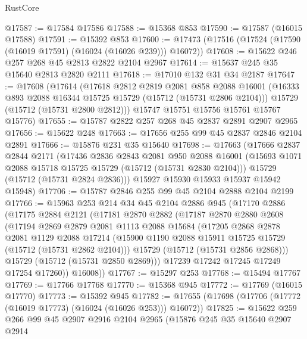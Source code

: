 \begin{lexlean}{RustCore}
\begin{coremodule}
@17587 := @17584 @17586
@17588 := @15368 @853
@17590 := @17587 (@16015 @17588)
@17591 := @15392 @853
@17600 := @17473 (@17516 (@17524 (@17590 (@16019 @17591) (@16024 (@16026 @239))) @16072))
@17608 := @15622 @246 @257 @268 @45 @2813 @2822 @2104 @2967
@17614 := @15637 @245 @35 @15640 @2813 @2820 @2111
@17618 := @17010 @132 @31 @34 @2187
@17647 := @17608
    (@17614
      (@17618
        @2812
        @2819
        @2081
        @858
        @2088
        @16001
        (@16333 @893 @2088 @16344 @15725 @15729 (@15712 (@15731 @2806 @2104)))
        @15729
        (@15712 (@15731 @2800 @2812)))
      @15747
      @15751
      @15756
      @15761
      @15767
      @15776)
@17655 := @15787 @2822 @257 @268 @45 @2837 @2891 @2907 @2965
@17656 := @15622 @248
@17663 := @17656 @255 @99 @45 @2837 @2846 @2104 @2891
@17666 := @15876 @231 @35 @15640
@17698 := @17663
    (@17666
      @2837
      @2844
      @2171
      (@17436
        @2836
        @2843
        @2081
        @950
        @2088
        @16001
        (@15693 @1071 @2088 @15718 @15725 @15729 (@15712 (@15731 @2830 @2104)))
        @15729
        (@15712 (@15731 @2824 @2836)))
      @15927
      @15930
      @15933
      @15937
      @15942
      @15948)
@17706 := @15787 @2846 @255 @99 @45 @2104 @2888 @2104 @2199
@17766 := @15963
    @253
    @214
    @34
    @45
    @2104
    @2886
    @945
    (@17170
      @2886
      (@17175
        @2884
        @2121
        (@17181
          @2870
          @2882
          (@17187
            @2870
            @2880
            @2608
            (@17194
              @2869
              @2879
              @2081
              @1113
              @2088
              @15684
              (@17205
                @2868
                @2878
                @2081
                @1129
                @2088
                @17214
                (@15900 @1190 @2088 @15911 @15725 @15729 (@15712 (@15731 @2862 @2104)))
                @15729
                (@15712 (@15731 @2856 @2868)))
              @15729
              (@15712 (@15731 @2850 @2869)))
            @17239
            @17242
            @17245
            @17249
            @17254
            @17260))
        @16008))
@17767 := @15297 @253
@17768 := @15494 @17767
@17769 := @17766 @17768
@17770 := @15368 @945
@17772 := @17769 (@16015 @17770)
@17773 := @15392 @945
@17782 := @17655 (@17698 (@17706 (@17772 (@16019 @17773) (@16024 (@16026 @253))) @16072))
@17825 := @15622
    @259
    @266
    @99
    @45
    @2907
    @2916
    @2104
    @2965
    (@15876
      @245
      @35
      @15640
      @2907
      @2914

\end{coremodule}
\end{lexlean}
